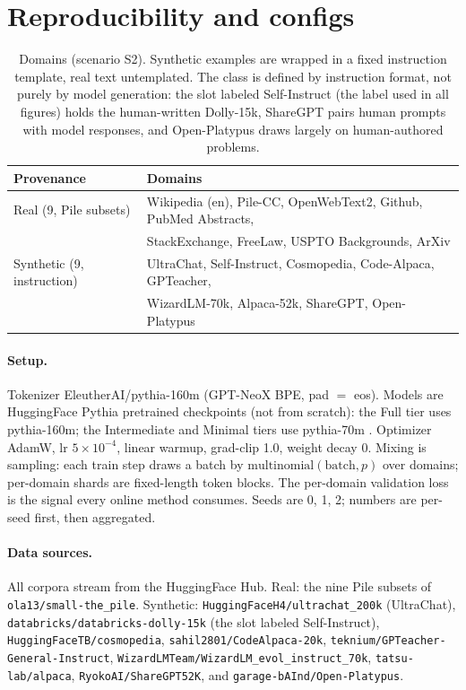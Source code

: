 \documentclass{article}
\begin{document}
\section{Reproducibility and configs}
\label{app:repro}

\begin{table}[t]
\centering
\small
\caption{Domains (scenario S2). Synthetic examples are wrapped in a fixed instruction template, real text untemplated. The class is defined by instruction format, not purely by model generation: the slot labeled Self-Instruct (the label used in all figures) holds the human-written Dolly-15k, ShareGPT pairs human prompts with model responses, and Open-Platypus draws largely on human-authored problems.}
\label{tab:domains}
\begin{tabular}{ll}
\toprule
Provenance & Domains \\
\midrule
Real (9, Pile subsets) & Wikipedia (en), Pile-CC, OpenWebText2, Github, PubMed Abstracts, \\
 & StackExchange, FreeLaw, USPTO Backgrounds, ArXiv \\
Synthetic (9, instruction) & UltraChat, Self-Instruct, Cosmopedia, Code-Alpaca, GPTeacher, \\
 & WizardLM-70k, Alpaca-52k, ShareGPT, Open-Platypus \\
\bottomrule
\end{tabular}
\end{table}

\paragraph{Setup.} Tokenizer EleutherAI/pythia-160m (GPT-NeoX BPE, pad $=$ eos). Models are HuggingFace Pythia pretrained checkpoints (not from scratch): the Full tier uses pythia-160m; the Intermediate and Minimal tiers use pythia-70m \citep{pythia2023}. Optimizer AdamW, lr $5\times10^{-4}$, linear warmup, grad-clip 1.0, weight decay 0. Mixing is sampling: each train step draws a batch by $\mathrm{multinomial}(\text{batch}, p)$ over domains; per-domain shards are fixed-length token blocks. The per-domain validation loss is the signal every online method consumes. Seeds are 0, 1, 2; numbers are per-seed first, then aggregated.

{\raggedright
\paragraph{Data sources.} All corpora stream from the HuggingFace Hub. Real: the nine Pile subsets of \texttt{ola13/small-the\_pile}. Synthetic: \texttt{HuggingFaceH4/ultrachat\_200k} (UltraChat), \texttt{databricks/databricks-dolly-15k} (the slot labeled Self-Instruct), \texttt{HuggingFaceTB/cosmopedia}, \texttt{sahil2801/CodeAlpaca-20k}, \texttt{teknium/GPTeacher-General-Instruct}, \texttt{WizardLMTeam/WizardLM\_evol\_instruct\_70k}, \texttt{tatsu-lab/alpaca}, \texttt{RyokoAI/ShareGPT52K}, and \texttt{garage-bAInd/Open-Platypus}.\par}
\end{document}
